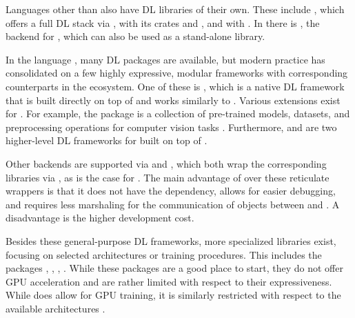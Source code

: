\documentclass[article]{jss}
\theoremstyle{definition}
\begin{document}
Languages other than \python{} also have DL libraries of their own.
These include \julia{} \citep{ref-bezanson2017julia}, which offers a full DL stack via \flux{} \citep{ref-innes2018flux}, \rust{} \citep{ref-matsakis2014rust} with its crates  \citep{ref-burn} and  \citep{ref-candle}, and  \citep{ref-go} with  \citep{ref-gomlx}.
In \cpp{} there is , the \cpp{} backend for \pytorch{}, which can also be used as a stand-alone \cpp{} library.

In the \rlang{} language \citep{ref-R-base}, many DL packages are available, but modern practice has consolidated on a few highly expressive, modular frameworks with corresponding counterparts in the \python{} ecosystem.
One of these is   \citep{ref-torch2025}, which is a native DL framework that is built directly on top of  and works similarly to \pytorch{}.
Various extensions exist for \torch{}.
For example, the  package is a collection of pre-trained models, datasets, and preprocessing operations for computer vision tasks \citep{ref-r-torchvision}.
Furthermore,  \citep{ref-luz2023} and  \citep{ref-cito2024} are two higher-level DL frameworks for \rlang{} built on top of \torch{}.

Other backends are supported via  \citep{ref-keras32025} and  \citep{ref-r-tensorflow2024}, which both wrap the corresponding \python{} libraries via  \citep{ref-reticulate2025}, as is the case for  \citep{ref-fastai}.
The main advantage of  over these reticulate wrappers is that it does not have the \python{} dependency, allows for easier debugging, and requires less marshaling for the communication of objects between \rlang{} and \python{}.
A disadvantage is the higher development cost.

Besides these general-purpose DL frameworks, more specialized libraries exist, focusing on selected architectures or training procedures.
This includes the packages , , ,  \citep{ref-nnet, ref-neuralnet, ref-deepnet, ref-rsnns}.
While these packages are a good place to start, they do not offer GPU acceleration and are rather limited with respect to their expressiveness.
While  does allow for GPU training, it is similarly restricted with respect to the available architectures \citep{ref-h2o}.
\end{document}
